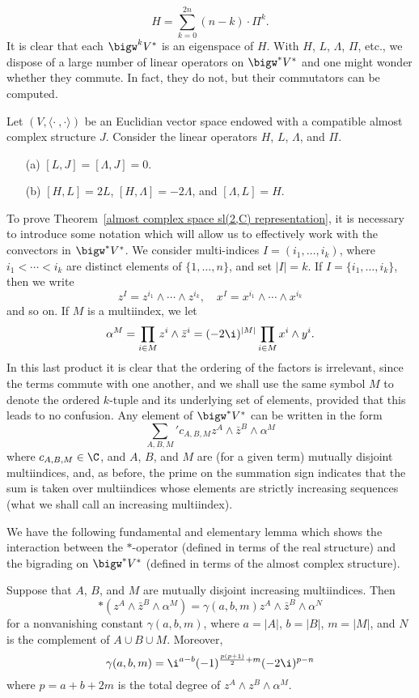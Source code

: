 \[H=\sum_{k=0}^{2n}(n-k)\cdot\Pi^k.\]
It is clear that each $\bigw^kV^*$ is an eigenspace of $H$. With $H$, $L$, $\Lambda$, $\Pi$, etc., we dispose of a large number of linear operators on $\bigw^*V^*$ and one might wonder whether they commute. In fact, they do not, but their commutators can be computed.
\begin{theorem}\label{almost complex space sl(2,C) representation}
Let $(V,\langle\cdot\ ,\cdot\rangle)$ be an Euclidian vector space endowed with a compatible almost complex structure $J$. Consider the linear operators $H$, $L$, $\Lambda$, and $\Pi$.
\begin{itemize}
\item[(a)] $[L,J]=[\Lambda,J]=0$.
\item[(b)] $[H,L]=2L$, $[H,\Lambda]=-2\Lambda$, and $[\Lambda,L]=H$.
\end{itemize}
\end{theorem}
To prove Theorem~\ref{almost complex space sl(2,C) representation}, it is necessary to introduce some notation which will allow us to effectively work with the convectors in $\bigw^*V^*$. We consider multi-indices $I=(i_1,\dots,i_k)$, where $i_1<\cdots<i_k$ are distinct elements of $\{1,\dots,n\}$, and set $|I|=k$. If $I=\{i_1,\dots,i_k\}$, then we write
\[z^I=z^{i_1}\wedge\cdots\wedge z^{i_k},\quad x^I=x^{i_1}\wedge\cdots\wedge x^{i_k}\]
and so on. If $M$ is a multiindex, we let
\[\alpha^M=\prod_{i\in M}z^i\wedge\bar{z}^i=(-2\i )^{|M|}\prod_{i\in M}x^i\wedge y^i.\]
In this last product it is clear that the ordering of the factors is irrelevant, since the terms commute with one another, and we shall use the same symbol $M$ to denote the ordered $k$-tuple and its underlying set of elements, provided that this leads to no confusion. Any element of $\bigw^*V^*$ can be written in the form
\[\sum_{A,B,M}'c_{A,B,M}z^A\wedge\bar{z}^B\wedge\alpha^M\]
where $c_{A,B,M}\in\C$, and $A$, $B$, and $M$ are (for a given term) mutually disjoint multiindices, and, as before, the prime on the summation sign indicates that the sum is taken over multiindices whose elements are strictly increasing sequences (what we shall call an increasing multiindex).\par
We have the following fundamental and elementary lemma which shows the interaction between the $\ast$-operator (defined in terms of the real structure) and the bigrading on $\bigw^*V^*$ (defined in terms of the almost complex structure).
\begin{lemma}\label{almost complex space Hodge star on standard form lemma}
Suppose that $A$, $B$, and $M$ are mutually disjoint increasing multiindices. Then
\[\ast(z^A\wedge\bar{z}^B\wedge\alpha^M)=\gamma(a,b,m)z^A\wedge\bar{z}^B\wedge\alpha^N\]
for a nonvanishing constant $\gamma(a,b,m)$, where $a=|A|$, $b=|B|$, $m=|M|$, and $N$ is the complement of $A\cup B\cup M$. Moreover,
\[\gamma(a,b,m)=\i^{a-b}(-1)^{\frac{p(p+1)}{2}+m}(-2\i)^{p-n}\]
where $p=a+b+2m$ is the total degree of $z^A\wedge z^B\wedge\alpha^M$.
\end{lemma}

